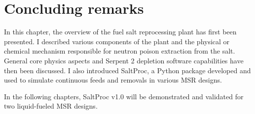 \section{Concluding remarks}
In this chapter, the overview of the fuel salt reprocessing plant has first 
been presented. I described various components of the plant and the physical 
or chemical mechanism responsible for neutron poison extraction from the 
salt. General core physics aspects and Serpent 2 depletion software 
capabilities have then been discussed. I also introduced SaltProc, a Python 
package developed and used to simulate continuous feeds and removals in 
various \gls{MSR} designs.

In the following chapters, SaltProc v1.0 will be demonstrated and validated 
for two liquid-fueled \gls{MSR} designs.